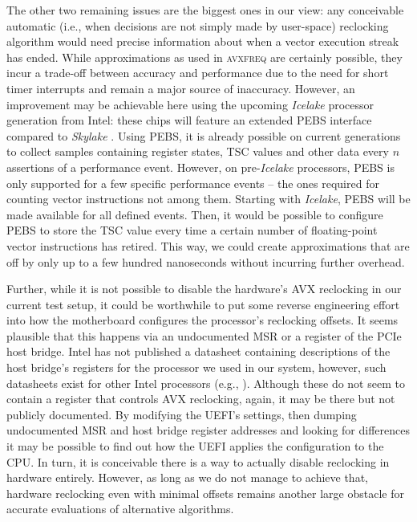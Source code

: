 The other two remaining issues are the biggest ones in our view: any conceivable automatic (i.e., when decisions are not simply made by user-space) reclocking algorithm would need precise information about when a vector execution streak has ended. While approximations as used in \textsc{avxfreq} are certainly possible, they incur a trade-off between accuracy and performance due to the need for short timer interrupts and remain a major source of inaccuracy. However, an improvement may be achievable here using the upcoming \textit{Icelake} processor generation from Intel: these chips will feature an extended \gls{PEBS} interface compared to \textit{Skylake} \cite{intelsdmsysprogguide}. Using \gls{PEBS}, it is already possible on current generations to collect samples containing register states, \gls{TSC} values and other data every $n$ assertions of a performance event. However, on pre-\textit{Icelake} processors, \gls{PEBS} is only supported for a few specific performance events -- the ones required for counting vector instructions not among them. Starting with \textit{Icelake}, \gls{PEBS} will be made available for all defined events. Then, it would be possible to configure \gls{PEBS} to store the \gls{TSC} value every time a certain number of floating-point vector instructions has retired. This way, we could create approximations that are off by only up to a few hundred nanoseconds without incurring further overhead.

Further, while it is not possible to disable the hardware's \gls{AVX} reclocking in our current test setup, it could be worthwhile to put some reverse engineering effort into how the motherboard configures the processor's reclocking offsets. It seems plausible that this happens via an undocumented \gls{MSR} or a register of the \gls{PCIe} host bridge. Intel has not published a datasheet containing descriptions of the host bridge's registers for the processor we used in our system, however, such datasheets exist for other Intel processors (e.g., \cite{intel7thgendatasheetvol2}). Although these do not seem to contain a register that controls \gls{AVX} reclocking, again, it may be there but not publicly documented. By modifying the \gls{UEFI}'s settings, then dumping undocumented \gls{MSR} and host bridge register addresses and looking for differences it may be possible to find out how the \gls{UEFI} applies the configuration to the \gls{CPU}. In turn, it is conceivable there is a way to actually disable reclocking in hardware entirely. However, as long as we do not manage to achieve that, hardware reclocking even with minimal offsets remains another large obstacle for accurate evaluations of alternative algorithms.

